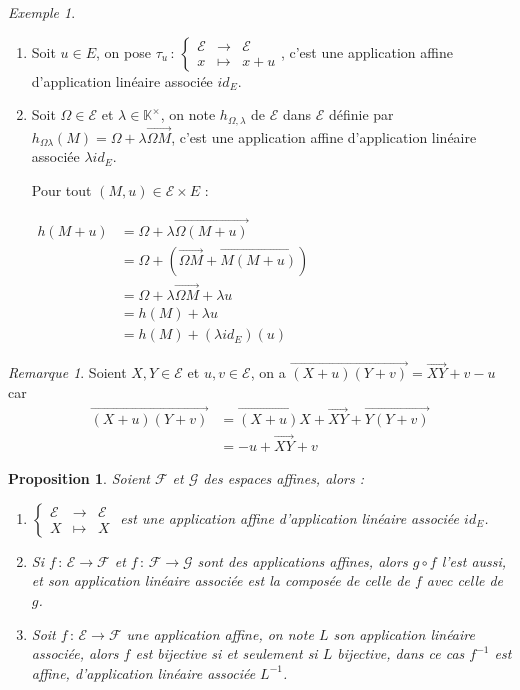 \documentclass[]{article}
\newtheorem{myproposition}{Proposition}
\theoremstyle{remark}
\newtheorem{myrem}{Remarque}
\newtheorem{myexmpl}{Exemple}
\theoremstyle{definition}
\newcommand{\func}[5]{
#1 \, : \, \left\{ \begin{array}{lcl}
	#2 & \longrightarrow & #3 \\
	#4 & \longmapsto & #5
\end{array}
\right.
}
\newcommand{\funcshort}[3]{
#1 \, : \, #2 \longrightarrow #3
}
\newcommand{\anonfunc}[4]{
\left\{ \begin{array}{lcl}
	#1 & \longrightarrow & #2 \\
	#3 & \longmapsto & #4
\end{array}
\right.
}
\begin{document}
\begin{myexmpl}
	\leavevmode
	
	\begin{enumerate}
		\item Soit $u \in E$, on pose $\func{\tau_u}{\mathcal{E}}{\mathcal{E}}{x}{x + u}$, c'est une application affine d'application linéaire associée $id_E$.
		
		\item Soit $\Omega \in \mathcal{E}$ et $\lambda \in \mathbb{K}^{\times}$, on note $h_{\Omega, \lambda}$ de $\mathcal{E}$ dans $\mathcal{E}$ définie par $h_{\Omega \lambda}(M) = \Omega + \lambda \overrightarrow{\Omega M}$, c'est une application affine d'application linéaire associée $\lambda id_E$.
		
		Pour tout $(M, u) \in \mathcal{E} \times E$ :
		
		$\begin{aligned}
		   h(M+u)& = \Omega + \lambda \overrightarrow{\Omega(M+u)} \\
		   & = \Omega + \left(\overrightarrow{\Omega M} + \overrightarrow{M(M+u)}\right) \\
		   & = \Omega + \lambda \overrightarrow{\Omega M} + \lambda u \\
		   & = h(M) + \lambda u \\
		   & = h(M) + (\lambda id_E)(u)
		 \end{aligned}$
		
	\end{enumerate}
\end{myexmpl}

\begin{myrem}
	Soient $X, Y \in \mathcal{E}$ et $u, v \in \mathcal{E}$, on a $\overrightarrow{(X+u)(Y+v)} = \overrightarrow{XY} + v - u$ car
	$$\begin{aligned}
		\overrightarrow{(X+u)(Y+v)}& = \overrightarrow{(X+u)X} + \overrightarrow{XY} + \overrightarrow{Y(Y+v)}	\\
		& = -u + \overrightarrow{XY} + v
	\end{aligned}$$
\end{myrem}

\begin{myproposition}
	Soient $\mathcal{F}$ et $\mathcal{G}$ des espaces affines, alors :
	\begin{enumerate}
		\item $\anonfunc{\mathcal{E}}{\mathcal{E}}{X}{X}$ est une application affine d'application linéaire associée $id_E$.
		
		\item Si $\funcshort{f}{\mathcal{E}}{\mathcal{F}}$ et $\funcshort{f}{\mathcal{F}}{\mathcal{G}}$ sont des applications affines, alors $g \circ f$ l'est aussi, et son application linéaire associée est la composée de celle de $f$ avec celle de $g$.
		
		\item Soit $\funcshort{f}{\mathcal{E}}{\mathcal{F}}$ une application affine, on note $L$ son application linéaire associée, alors $f$ est bijective si et seulement si $L$ bijective, dans ce cas $f^{-1}$ est affine, d'application linéaire associée $L^{-1}$.
	\end{enumerate}
\end{myproposition}
\end{document}
